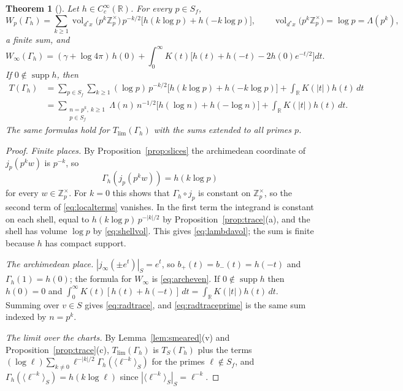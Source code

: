 \documentclass[11pt]{amsart}
\newtheorem{theorem}{Theorem}[section]
\theoremstyle{definition}
\newcommand{\R}{\mathbb R}
\newcommand{\Z}{\mathbb Z}
\newcommand{\supp}{\operatorname{supp}}
\newcommand{\vol}{\operatorname{vol}}
\begin{document}
\begin{theorem}[{\cite[(82), (32) and Lemma~A.1]{Companion}}]
\label{thm:radtrace}
Let $h\in C_c^\infty(\R)$. For every $p\in S_f$,
\begin{equation}\label{eq:lambdavol}
  W_p(\Gamma_h)=\sum_{k\ge1}\vol_{d^*x}\bigl(p^k\Z_p^\times\bigr)\,p^{-k/2}
    \bigl[h(k\log p)+h(-k\log p)\bigr],\qquad
  \vol_{d^*x}\bigl(p^k\Z_p^\times\bigr)=\log p=\Lambda(p^k),
\end{equation}
a finite sum, and
\[
  W_\infty(\Gamma_h)=(\gamma+\log4\pi)\,h(0)+\int_0^\infty
    K(t)\bigl[h(t)+h(-t)-2h(0)e^{-t/2}\bigr]dt .
\]
If $0\notin\supp h$, then
\begin{align}
  T(\Gamma_h)&=\sum_{p\in S_f}\sum_{k\ge1}(\log p)\,p^{-k/2}
    \bigl[h(k\log p)+h(-k\log p)\bigr]+\int_\R K(|t|)h(t)\,dt
     \label{eq:radtrace}\\
  &=\sum_{\substack{n=p^k,\ k\ge1\\ p\in S_f}}\Lambda(n)\,n^{-1/2}
    \bigl[h(\log n)+h(-\log n)\bigr]+\int_\R K(|t|)h(t)\,dt .
     \label{eq:radtraceprime}
\end{align}
The same formulas hold for $T_{\lim}(\Gamma_h)$ with the sums extended to all
primes $p$.
\end{theorem}

\begin{proof}
\emph{Finite places.} By Proposition~\ref{prop:slices} the archimedean
coordinate of $j_p(p^kw)$ is $p^{-k}$, so
\[
  \Gamma_h(j_p(p^kw))=h(k\log p)
\]
for every $w\in\Z_p^\times$. For $k=0$ this shows that $\Gamma_h\circ j_p$ is
constant on $\Z_p^\times$, so the second term of \eqref{eq:localterms}
vanishes. In the first term the integrand is constant on each shell, equal to
$h(k\log p)\,p^{-|k|/2}$ by Proposition~\ref{prop:trace}(a), and the shell has
volume $\log p$ by \eqref{eq:shellvol}. This gives \eqref{eq:lambdavol}; the
sum is finite because $h$ has compact support.

\emph{The archimedean place.} $|j_\infty(\pm e^t)|_S=e^t$, so
$b_+(t)=b_-(t)=h(-t)$ and $\Gamma_h(1)=h(0)$; the formula for $W_\infty$ is
\eqref{eq:archeven}. If $0\notin\supp h$ then $h(0)=0$ and
$\int_0^\infty K(t)[h(t)+h(-t)]\,dt=\int_\R K(|t|)h(t)\,dt$. Summing over
$v\in S$ gives \eqref{eq:radtrace}, and \eqref{eq:radtraceprime} is the same
sum indexed by $n=p^k$.

\emph{The limit over the charts.} By Lemma~\ref{lem:smeared}(v) and
Proposition~\ref{prop:trace}(c), $T_{\lim}(\Gamma_h)$ is $T_S(\Gamma_h)$ plus
the terms $(\log\ell)\sum_{k\ne0}\ell^{-|k|/2}
\Gamma_h(\langle\ell^{-k}\rangle_S)$ for the primes $\ell\notin S_f$, and
$\Gamma_h(\langle\ell^{-k}\rangle_S)=h(k\log\ell)$ since
$|\langle\ell^{-k}\rangle_S|_S=\ell^{-k}$.
\end{proof}
\end{document}
